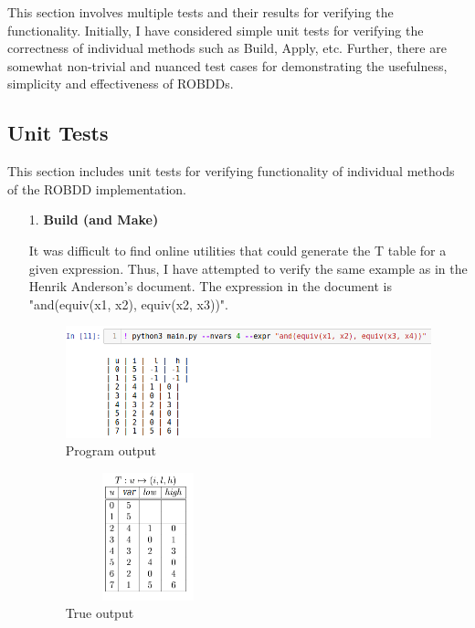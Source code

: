 \documentclass[a4paper, titlepage, 12pt]{article}
\numberwithin{equation}{section}
\begin{document}
        This section involves multiple tests and their results for verifying the functionality.
        Initially, I have considered simple unit tests for verifying the correctness of individual methods such as Build, Apply, etc. 
        Further, there are somewhat non-trivial and nuanced test cases for demonstrating the usefulness, simplicity and effectiveness of ROBDDs.

        \subsection{Unit Tests}

            This section includes unit tests for verifying functionality of individual methods of the ROBDD implementation.

            \begin{itemize}
                \item[1.] \textbf{Build (and Make)}
                    
                    It was difficult to find online utilities that could generate the T table for a given expression.
                    Thus, I have attempted to verify the same example as in the Henrik Anderson's document.
                    The expression in the document is "and(equiv(x1, x2), equiv(x2, x3))".

                    \begin{figure}[htp]
                        \centering
                        \includegraphics[height=0.3\textwidth, width=\textwidth]{img/robdd_build.png}
                        \caption{Program output}
                        \label{fig:build_prog_out}
                    \end{figure}
                    
                    \begin{figure}[htp]
                        \centering
                        \includegraphics[height=140px, width=180px]{img/true_T_build.png}
                        \caption{True output}
                        \label{fig:build_true_out}
                    \end{figure}


\end{itemize}
\end{document}

